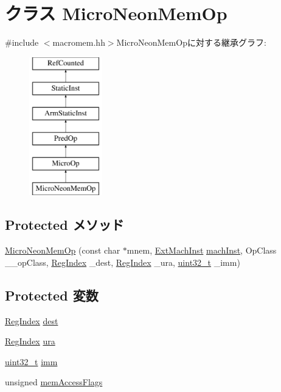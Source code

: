 \hypertarget{classArmISA_1_1MicroNeonMemOp}{
\section{クラス MicroNeonMemOp}
\label{classArmISA_1_1MicroNeonMemOp}
}


{\ttfamily \#include $<$macromem.hh$>$}MicroNeonMemOpに対する継承グラフ:\begin{figure}[H]
\begin{center}
\leavevmode
\includegraphics[height=6cm]{classArmISA_1_1MicroNeonMemOp}
\end{center}
\end{figure}
\subsection*{Protected メソッド}
\begin{DoxyCompactItemize}
\item 
\hyperlink{classArmISA_1_1MicroNeonMemOp_a9ec783f147082cdedf23edaec11108bc}{MicroNeonMemOp} (const char $\ast$mnem, \hyperlink{classStaticInst_a5605d4fc727eae9e595325c90c0ec108}{ExtMachInst} \hyperlink{classStaticInst_a744598b194ca3d4201d9414ce4cc4af4}{machInst}, OpClass \_\-\_\-opClass, \hyperlink{classStaticInst_a36d25e03e43fa3bb4c5482cbefe5e0fb}{RegIndex} \_\-dest, \hyperlink{classStaticInst_a36d25e03e43fa3bb4c5482cbefe5e0fb}{RegIndex} \_\-ura, \hyperlink{Type_8hh_a435d1572bf3f880d55459d9805097f62}{uint32\_\-t} \_\-imm)
\end{DoxyCompactItemize}
\subsection*{Protected 変数}
\begin{DoxyCompactItemize}
\item 
\hyperlink{classStaticInst_a36d25e03e43fa3bb4c5482cbefe5e0fb}{RegIndex} \hyperlink{classArmISA_1_1MicroNeonMemOp_a6563276134c2f303bab0c30e83e02220}{dest}
\item 
\hyperlink{classStaticInst_a36d25e03e43fa3bb4c5482cbefe5e0fb}{RegIndex} \hyperlink{classArmISA_1_1MicroNeonMemOp_a8e6cd3e234a4950e7a1a05f1b24cfee0}{ura}
\item 
\hyperlink{Type_8hh_a435d1572bf3f880d55459d9805097f62}{uint32\_\-t} \hyperlink{classArmISA_1_1MicroNeonMemOp_a3aa9e175bd81b38df0e566643d5d4f8d}{imm}
\item 
unsigned \hyperlink{classArmISA_1_1MicroNeonMemOp_a827c936c9e2b1f1cf21a01f204a8d821}{memAccessFlags}
\end{DoxyCompactItemize}


